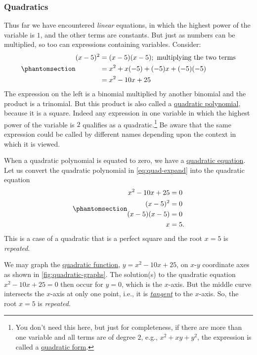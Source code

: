 \documentclass[
  a4paper,
]{article}
\begin{document}
\subsubsection{Quadratics}\label{quadratics}

Thus far we have encountered \emph{linear} equations, in which the
highest power of the variable is \(1\), and the other terms are
constants. But just as numbers can be multiplied, so too can expressions
containing variables. Consider:
\begin{equation}\phantomsection\label{eq:quad-expand}{
\begin{aligned}
(x - 5)^{2} &= (x - 5)(x - 5); \text{ multiplying the two terms}\\
&= x^2 +x(-5) + (-5)x + (-5)(-5)\\
&= x^2 - 10x + 25
\end{aligned}
}\end{equation} The expression on the left is a binomial multiplied by
another binomial and the product is a trinomial. But this product is
also called a \href{https://en.wikipedia.org/wiki/Quadratic}{quadratic
polynomial}, because it is a square. Indeed any expression in one
variable in which the highest power of the variable is \(2\) qualifies
as a quadratic.\footnote{You don't need this here, but just for
  completeness, if there are more than one variable and all terms are of
  degree \(2\), e.g., \(x^2 + xy + y^2\), the expression is called a
  \href{https://en.wikipedia.org/wiki/Quadratic_form}{quadratic form}.}
Be aware that the same expression could be called by different names
depending upon the context in which it is viewed.

When a quadratic polynomial is equated to zero, we have a
\href{https://en.wikipedia.org/wiki/Quadratic_equation}{quadratic
equation}. Let us convert the quadratic polynomial in
\cref{eq:quad-expand} into the quadratic equation
\begin{equation}\phantomsection\label{eq:repeated-root}{
\begin{aligned}
x^2 -10x + 25 &= 0\\
(x - 5)^2 &= 0\\
(x - 5)(x - 5) &= 0\\
x &= 5.
\end{aligned}
}\end{equation} This is a case of a quadratic that is a perfect square
and the root \(x = 5\) is \emph{repeated}.

We may graph the
\href{https://en.wikipedia.org/wiki/Quadratic_function}{quadratic
function}, \(y = x^2 -10x + 25\), on \(x\)-\(y\) coordinate axes as
shown in \cref{fig:quadratic-graphs}. The solution(s) to the quadratic
equation \(x^2 -10x + 25 = 0\) then occur for \(y = 0\), which is the
\(x\)-axis. But the middle curve intersects the \(x\)-axis at only one
point, i.e., it is
\href{https://en.wikipedia.org/wiki/Tangent}{\emph{tangent}} to the
\(x\)-axis. So, the root \(x = 5\) is \emph{repeated}.
\end{document}
